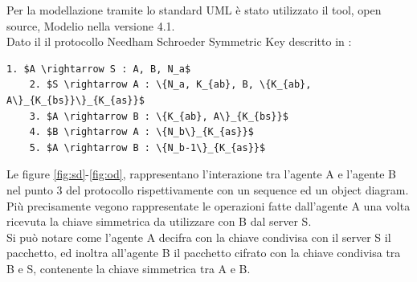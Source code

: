 Per la modellazione tramite lo standard UML è stato utilizzato il tool, open source, Modelio nella versione 4.1.\\
Dato il il protocollo Needham Schroeder Symmetric Key descritto in \cite{NS78}:
\begin{lstlisting}[mathescape]
    1. $A \rightarrow S : A, B, N_a$
    2. $S \rightarrow A : \{N_a, K_{ab}, B, \{K_{ab}, A\}_{K_{bs}}\}_{K_{as}}$
    3. $A \rightarrow B : \{K_{ab}, A\}_{K_{bs}}$
    4. $B \rightarrow A : \{N_b\}_{K_{as}}$
    5. $A \rightarrow B : \{N_b-1\}_{K_{as}}$
\end{lstlisting}
Le figure \ref*{fig:sd}-\ref*{fig:od}, rappresentano l'interazione tra l'agente A e l'agente B nel punto 3 del protocollo rispettivamente con un sequence ed un object diagram.\\
Più precisamente vegono rappresentate le operazioni fatte dall'agente A una volta ricevuta la chiave simmetrica da utilizzare con B dal server S.\\
Si può notare come l'agente A decifra con la chiave condivisa con il server S il pacchetto, ed inoltra all'agente B il pacchetto cifrato con la chiave condivisa tra B e S, contenente la chiave simmetrica tra A e B.\\

